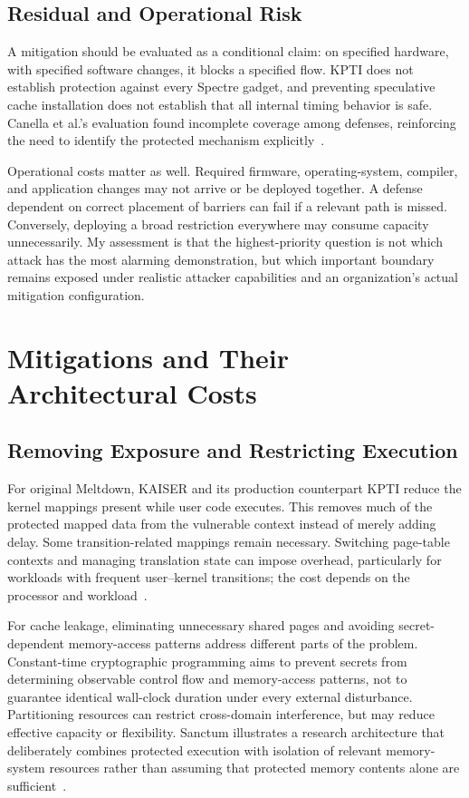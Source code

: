 \documentclass[man,12pt,apacite,nofontenc,nolmodern,floatsintext]{apa6}
\begin{document}
\subsection{Residual and Operational Risk}
A mitigation should be evaluated as a conditional claim: on specified hardware, with specified software changes, it blocks a specified flow. KPTI does not establish protection against every Spectre gadget, and preventing speculative cache installation does not establish that all internal timing behavior is safe. Canella et al.'s evaluation found incomplete coverage among defenses, reinforcing the need to identify the protected mechanism explicitly~\cite{canella2019}.

Operational costs matter as well. Required firmware, operating-system, compiler, and application changes may not arrive or be deployed together. A defense dependent on correct placement of barriers can fail if a relevant path is missed. Conversely, deploying a broad restriction everywhere may consume capacity unnecessarily. My assessment is that the highest-priority question is not which attack has the most alarming demonstration, but which important boundary remains exposed under realistic attacker capabilities and an organization's actual mitigation configuration.

\section{Mitigations and Their Architectural Costs}
\subsection{Removing Exposure and Restricting Execution}
For original Meltdown, KAISER and its production counterpart KPTI reduce the kernel mappings present while user code executes. This removes much of the protected mapped data from the vulnerable context instead of merely adding delay. Some transition-related mappings remain necessary. Switching page-table contexts and managing translation state can impose overhead, particularly for workloads with frequent user--kernel transitions; the cost depends on the processor and workload~\cite{meltdown2018}.

For cache leakage, eliminating unnecessary shared pages and avoiding secret-dependent memory-access patterns address different parts of the problem. Constant-time cryptographic programming aims to prevent secrets from determining observable control flow and memory-access patterns, not to guarantee identical wall-clock duration under every external disturbance. Partitioning resources can restrict cross-domain interference, but may reduce effective capacity or flexibility. Sanctum illustrates a research architecture that deliberately combines protected execution with isolation of relevant memory-system resources rather than assuming that protected memory contents alone are sufficient~\cite{sanctum2016}.
\end{document}
